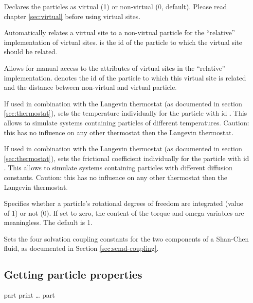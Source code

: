\begin{arguments}
\item[\opt{virtual \var{v}}] Declares the particles as virtual (1) or
  non-virtual (0, default). Please read chapter \ref{sec:virtual}
  before using virtual sites.
\item[\opt{vs\_auto\_relate\_to \var{pid}}] Automatically relates a
  virtual site to a non-virtual particle for the ``relative''
  implementation of virtual sites.  is the id of the particle
  to which the virtual site should be related.
\item[\opt{vs\_relative \var{pid} \var{distance}}] Allows for manual
  access to the attributes of virtual sites in the ``relative''
  implementation.  denotes the id of the particle to which
  this virtual site is related and  the distance between
  non-virtual and virtual particle.
\item[\opt{temp \var{T}}] If used in combination with the Langevin
  thermostat (as documented in section \ref{sec:thermostat}), sets the
  temperature  individually for the particle with id
  . This allows to simulate systems containing particles of
  different temperatures. Caution: this has no influence on any other
  thermostat then the Langevin thermostat.
\item[\opt{gamma \var{g}}] If used in combination with the Langevin
  thermostat (as documented in section \ref{sec:thermostat}), sets the
  frictional coefficient  individually for the particle with id
  . This allows to simulate systems containing particles with
  different diffusion constants. Caution: this has no influence on any
  other thermostat then the Langevin thermostat.
\item[\opt{rotation \var{rot}}] Specifies whether a particle's
  rotational degrees of freedom are integrated (value of 1) or not
  (0). If set to zero, the content of the torque and omega variables
  are meaningless. The default is 1.
\item[\opt{solvation \var{lA} \var{kA} \var{lB} \var{kB}}] Sets the
  four solvation coupling constants for the two components of a
  Shan-Chen fluid, as documented in Section \ref{sec:scmd-coupling}.
\end{arguments}


\subsection{Getting particle properties}
\begin{essyntax}
  part  print
  \dots
   part
\end{essyntax}

